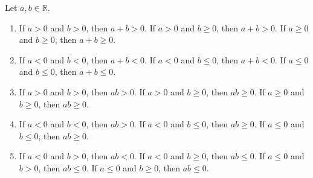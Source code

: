 \begin{lemma} %
	\label{rpr:l:pos_neg}

	Let $a, b \in \mathbb{R}$.
	\begin{enumerate}
		\item \label{rpr:l:pos_neg:1}
		      If $a > 0$ and $b > 0$, then $a + b > 0$. If $a > 0$ and $b \geq 0$, then $a + b > 0$. If $a \geq 0$ and $b \geq 0$, then $a+b \geq 0$.
		\item \label{rpr:l:pos_neg:2}
		      If $a < 0$ and $b < 0$, then $a + b < 0$. If $a < 0$ and $b \leq 0$, then $a + b < 0$. If $a \leq 0$ and $b \leq 0$, then $a+b \leq 0$.
		\item \label{rpr:l:pos_neg:3}
		      If $a > 0$ and $b > 0$, then $a b > 0$. If $a > 0$ and $b \geq 0$, then $a b \geq 0$. If $a \geq 0$ and $b \geq 0$, then $a b \geq 0$.
		\item \label{rpr:l:pos_neg:4}
		      If $a < 0$ and $b < 0$, then $a b > 0$. If $a < 0$ and $b \leq 0$, then $a b \geq 0$. If $a \leq 0$ and $b \leq 0$, then $a b \geq 0$.
		\item \label{rpr:l:pos_neg:5}
		      If $a < 0$ and $b > 0$, then $a b < 0$. If $a < 0$ and $b \geq 0$, then $a b \leq 0$. If $a \leq 0$ and $b>0$, then $a b \leq 0$. If $a \leq 0$ and $b \geq 0$, then $a b \leq 0$.
	\end{enumerate}
\end{lemma}

